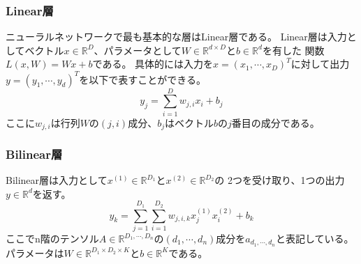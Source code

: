 \subsubsection{\rm Linear\mc 層}
ニューラルネットワークで最も基本的な層はLinear層である。
Linear層は入力としてベクトル\(x \in \mathbb R^D\)、パラメータとして\(W \in \mathbb R^{d\times D}\)と\(b \in \mathbb R^d\)を有した
関数\(L(x,W) = Wx + b\)である。
具体的には入力を\(x=(x_1,\cdots,x_D)^T\)に対して出力\(y=(y_1,\cdots,y_d)^T\)を以下で表すことができる。
\begin{equation}
    y_j = \sum_{i=1}^D  w_{j,i}x_i + b_j 
\end{equation}
ここに\(w_{j,i}\)は行列\(W\)の\((j,i)\)成分、\(b_j\)はベクトル\(b\)の\(j\)番目の成分である。

\subsubsection{\rm Bilinear\mc 層}
Bilinear層は入力として\(x^{(1)}\in \mathbb R^{D_1}\)と\(x^{(2)}\in \mathbb R^{D_2}\)の
2つを受け取り、1つの出力\(y \in \mathbb R^d\)を返す。
\begin{equation}
    y_k = \sum_{j=1}^{D_1}\sum_{i=1}^{D_2}w_{j,i,k}x_j^{(1)}x_i^{(2)} + b_k
\end{equation}
ここでn階のテンソル\(A\in \mathbb R^{D_1,\cdots ,D_n}\)の\((d_1,\cdots,d_n)\)成分を\(a_{d_1,\cdots,d_n}\)と表記している。
パラメータは\(W\in \mathbb R^{D_1\times D_2 \times K}\)と\(b \in \mathbb R^K\)である。

